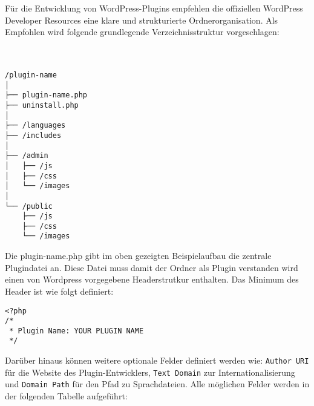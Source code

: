 Für die Entwicklung von WordPress-Plugins empfehlen die offiziellen WordPress Developer Resources eine klare und strukturierte Ordnerorganisation\cite{wordpress2024BestPractices}.
Als Empfohlen wird folgende grundlegende Verzeichnisstruktur vorgeschlagen:
\\\\\\
\begin{lstlisting}[caption={Beispielhafte Plugin-Verzeichnisstruktur in WordPress}, label={lst:plugin-structure}]
/plugin-name
│
├── plugin-name.php
├── uninstall.php
│
├── /languages
├── /includes
│
├── /admin
│   ├── /js
│   ├── /css
│   └── /images
│
└── /public
    ├── /js
    ├── /css
    └── /images
\end{lstlisting}

Die plugin-name.php gibt im oben gezeigten Beispielaufbau die zentrale Plugindatei an.
Diese Datei muss damit der Ordner als Plugin verstanden wird einen von Wordpress vorgegebene Headerstrutkur enthalten.
Das Minimum des Header ist wie folgt definiert:

\begin{lstlisting}[caption={Minimaler Plugin-Header in WordPress}, label={lst:plugin-header}]
<?php
/*
 * Plugin Name: YOUR PLUGIN NAME
 */
\end{lstlisting}

Darüber hinaus können weitere optionale Felder definiert werden wie:
\texttt{Author URI} für die Website des Plugin-Entwicklers, \texttt{Text Domain}
zur Internationalisierung und \texttt{Domain Path} für den Pfad zu Sprachdateien.
Alle möglichen Felder werden in der folgenden Tabelle aufgeführt:
\renewcommand{\arraystretch}{1.3}

